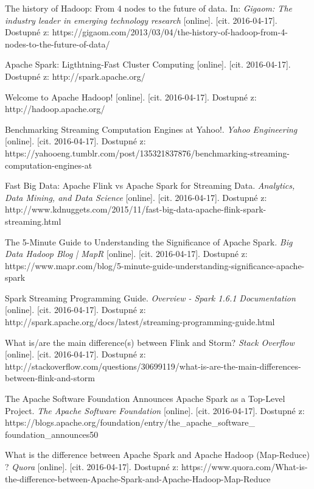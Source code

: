 \documentclass[thesis=B,czech]{FITthesis}[2012/06/26]
\begin{document}
\begin{thebibliography}{1}
The history of Hadoop: From 4 nodes to the future of data. In: \textit{Gigaom: The industry leader in emerging technology research} [online]. [cit. 2016-04-17]. Dostupné z: https://gigaom.com/2013/03/04/the-history-of-hadoop-from-4-nodes-to-the-future-of-data/

Apache Spark: Ligthtning-Fast Cluster Computing [online]. [cit. 2016-04-17]. Dostupné z: http://spark.apache.org/

Welcome to Apache Hadoop! [online]. [cit. 2016-04-17]. Dostupné z: http://hadoop.apache.org/

Benchmarking Streaming Computation Engines at Yahoo!. \textit{Yahoo Engineering} [online]. [cit. 2016-04-17]. Dostupné z: https://yahooeng.tumblr.com/post/135321837876/benchmarking-streaming-computation-engines-at

Fast Big Data: Apache Flink vs Apache Spark for Streaming Data. \textit{Analytics, Data Mining, and Data Science} [online]. [cit. 2016-04-17]. Dostupné z: http://www.kdnuggets.com/2015/11/fast-big-data-apache-flink-spark-streaming.html

The 5-Minute Guide to Understanding the Significance of Apache Spark. \textit{Big Data Hadoop Blog | MapR} [online]. [cit. 2016-04-17]. Dostupné z: https://www.mapr.com/blog/5-minute-guide-understanding-significance-apache-spark

Spark Streaming Programming Guide. \textit{Overview - Spark 1.6.1 Documentation} [online]. [cit. 2016-04-17]. Dostupné z: http://spark.apache.org/docs/latest/streaming-programming-guide.html

What is/are the main difference(s) between Flink and Storm? \textit{Stack Overflow} [online]. [cit. 2016-04-17]. Dostupné z: http://stackoverflow.com/questions/30699119/what-is-are-the-main-differences-between-flink-and-storm

The Apache Software Foundation Announces Apache Spark as a Top-Level Project. \textit{The Apache Software Foundation} [online]. [cit. 2016-04-17]. Dostupné z: https://blogs.apache.org/foundation/entry/the\_apache\_software\_\\foundation\_announces50

What is the difference between Apache Spark and Apache Hadoop (Map-Reduce) ? \textit{Quora} [online]. [cit. 2016-04-17]. Dostupné z: https://www.quora.com/What-is-the-difference-between-Apache-Spark-and-Apache-Hadoop-Map-Reduce


\end{thebibliography}
\end{document}
